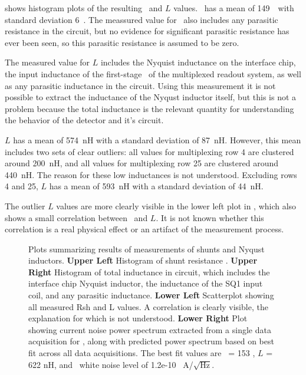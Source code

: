  shows histogram plots of the resulting \Rsh\ and $L$ values.
\Rsh\ has a mean of 149~\uOhm\ with standard deviation 6~\uOhm.
The meassured value for \Rsh\ also includes any parasitic resistance in the circuit, but no evidence for significant parasitic resistance has ever been seen, so this parasitic resistance is assumed to be zero.

The measured value for $L$ includes the Nyquist inductance on the interface chip, the input inductance of the first-stage \SQUID\ of the multiplexed readout system, as well as any parasitic inductance in the circuit.
Using this measurement it is not possible to extract the inductance of the Nyqust inductor itself, but this is not a problem because the total inductance is the relevant  quantity for understanding the behavior of the detector and it's circuit.

$L$ has a mean of 574~nH with a standard deviation of 87~nH.
However, this mean includes two sets of clear outliers: all values for multiplexing row 4 are clustered around 200~nH, and all values for multiplexing row 25 are clustered around 440~nH.
The reason for these low inductances is not understood.
Excluding rows 4 and 25,  $L$ has a mean of 593~nH with a standard deviation of 44~nH.

The outlier $L$ values are more clearly visible in the lower left plot in , which also shows a small correlation between \Rsh\ and $L$.
It is not known whether this correlation is a real physical effect or an artifact of the measurement process.

\begin{figure*}

\caption{Plots summarizing results of measurements of shunts and Nyqust inductors.
\textbf{Upper Left} Histogram of shunt resistance \Rsh.
\textbf{Upper Right} Histogram of total inductance in circuit, which includes the interface chip Nyquist inductor, the inductance of the SQ1 input coil, and any parasitic inductance.
\textbf{Lower Left} Scatterplot showing all measured Rsh and L values. A correlation is clearly visible, the explanation for which is not understood.
\textbf{Lower Right} Plot showing current noise power spectrum extracted from a single data acquisition for , along with predicted power spectrum based on best fit across all data acquisitions. The best fit values are \Rsh\ = 153 \uOhm, $L$ = 622 nH, and \SQUID\ white noise level of 1.2e-10~ A/$\sqrt{\mbox{Hz}}$.}
\label{fig:rsh-l-plots}
\end{figure*}

